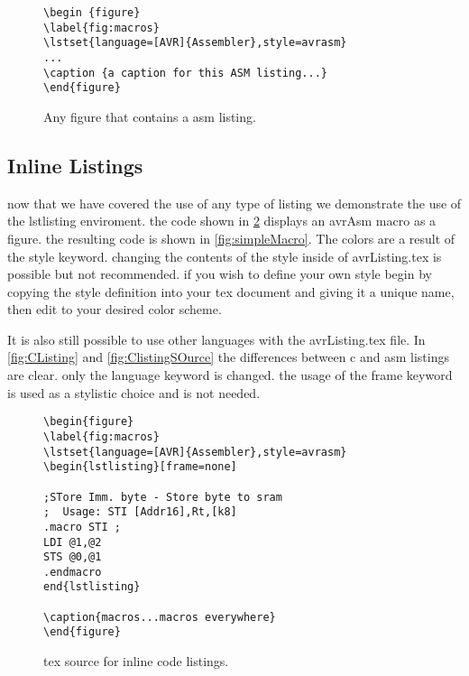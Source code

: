 \documentclass[titlepage]{article}
\begin{document}
\begin{figure}[h!]
\label{fig:figurePreamble}
\lstset{language=Tex}
\begin{lstlisting}
\begin {figure}
\label{fig:macros}
\lstset{language=[AVR]{Assembler},style=avrasm}
...
\caption {a caption for this ASM listing...}
\end{figure}

\end{lstlisting}
\caption{Any figure that contains a asm listing.}
\end{figure}

\subsection{Inline Listings}
now that we have covered the use of any type of listing we demonstrate the use of the lstlisting enviroment. the code shown in \cref{fig:inlineExample} displays an avrAsm macro as a figure. the resulting code is shown in \cref{fig:simpleMacro}. The colors are a result of the style keyword. changing the contents of the style inside of avrListing.tex is possible but not recommended. if you wish to define your own style begin by copying the style definition into your tex document and giving it a unique name, then edit to your desired color scheme.

It is also still possible to use other languages with the avrListing.tex file. In \cref{fig:CListing} and \cref{fig:ClistingSOurce} the differences between c and asm listings are clear. only the language keyword is changed. the usage of the frame keyword is used as a stylistic choice and is not needed.

\begin{figure}
\label{fig:inlineExample}
\begin{lstlisting}[language=Tex,frame=single]
\begin{figure}
\label{fig:macros}
\lstset{language=[AVR]{Assembler},style=avrasm}
\begin{lstlisting}[frame=none]

;STore Imm. byte - Store byte to sram
;  Usage: STI [Addr16],Rt,[k8]
.macro STI ;
LDI @1,@2
STS @0,@1
.endmacro
end{lstlisting}

\caption{macros...macros everywhere}
\end{figure}
\end{lstlisting}
\caption{tex source for inline code listings.}
\end{figure}
\end{document}
